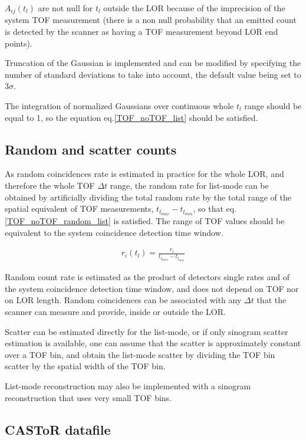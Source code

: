 \documentclass[a4paper, 11pt]{article}
\begin{document}
$A_{ij}(t_l)$ are not null for $t_l$ outside the LOR because of the imprecision of the system TOF measurement (there is a non null probability that an emitted count is detected by the scanner as having a TOF measurement beyond LOR end points). 

Truncation of the Gaussian is implemented and can be modified by specifying the number of standard deviations to take into account, the default value being set to $3\sigma$.

The integration of normalized Gaussians over continuous whole $t_l$ range should be equal to 1, so the equation eq.\ref{TOF_noTOF_list} should be satisfied.

\subsection{Random and scatter counts}

As random coincidences rate is estimated in practice for the whole LOR, and therefore the whole TOF $\Delta t$ range, the random rate for list-mode can be obtained by artificially dividing the total random rate by the total range of the spatial equivalent of TOF measurements, $t_{l_{max}}-t_{l_{min}}$, so that eq.\ref{TOF_noTOF_random_list} is satisfied. The range of TOF values should be equivalent to the system coincidence detection time window.

\begin{align}
r_{i}(t_l)=\frac{r_i}{t_{l_{max}}-t_{l_{min}}}
\end{align}

Random count rate is estimated as the product of detectors single rates and of the system coincidence detection time window, and does not depend on TOF nor on LOR length. Random coincidences can be associated with any $\Delta t$ that the scanner can measure and provide, inside or outside the LOR.

Scatter can be estimated directly for the list-mode, or if only sinogram scatter estimation is available, one can assume that the scatter is approximately constant over a TOF bin, and obtain the list-mode scatter by dividing the TOF bin scatter by the spatial width of the TOF bin.

List-mode reconstruction may also be implemented with a sinogram reconstruction that uses very small TOF bins.

\subsection{CASToR datafile}
\end{document}
